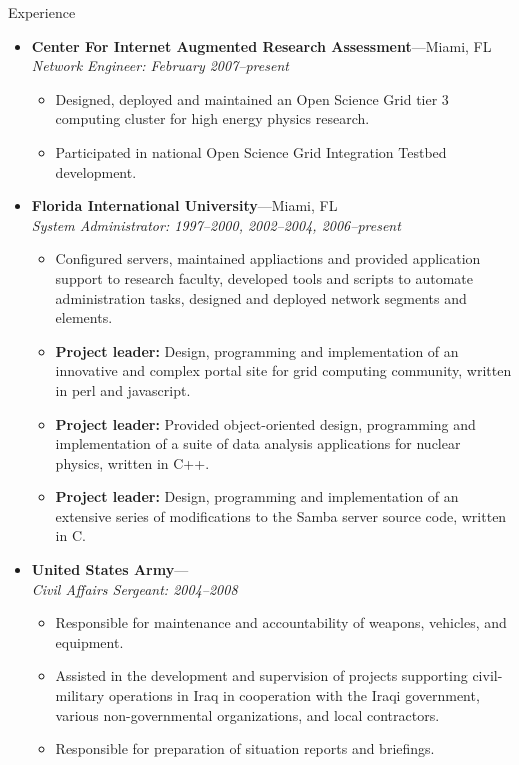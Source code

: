 \documentclass[9pt,oneside]{article}
\newenvironment{ressection}[1]{
	\vspace{4pt}
	{\fontfamily{phv}\selectfont\Large#1}
	\begin{itemize}
	\vspace{3pt}
}{
	\end{itemize}
}
\newcommand{\ressubitem}[1]{
	\vspace{-1pt}
	\item \begin{flushleft} #1 \end{flushleft}
}
\newcommand{\resbigitem}[3]{
	\vspace{-5pt}
	\item
	\textbf{#1}---#2 \\
	\textit{#3}
}
\newenvironment{ressubsec}[3]{
	\resbigitem{#1}{#2}{#3}
	\vspace{-2pt}
	\begin{itemize}
}{
	\end{itemize}
}
\begin{document}
\begin{ressection}{Experience}

	\begin{ressubsec}{Center For Internet Augmented Research Assessment}{Miami, FL}{Network Engineer: February 2007--present}
		\ressubitem{Designed, deployed and maintained an Open Science Grid tier 3 computing cluster for high energy physics research.}
		\ressubitem{Participated in national Open Science Grid Integration Testbed development.}
	\end{ressubsec}

	\begin{ressubsec}{Florida International University}{Miami, FL}{System Administrator: 1997--2000, 2002--2004, 2006--present}
		\ressubitem{Configured servers, maintained appliactions and provided application support to research faculty, developed tools and scripts to automate administration tasks, designed and deployed network segments and elements.}
		\ressubitem{\textbf{Project leader:} Design, programming and implementation of an innovative and complex portal site for grid computing community, written in perl and javascript.}
		\ressubitem{\textbf{Project leader:} Provided object-oriented design, programming and implementation of a suite of data analysis applications for nuclear physics, written in C++.}
		\ressubitem{\textbf{Project leader:} Design, programming and implementation of an extensive series of modifications to the Samba server source code, written in C.}
	\end{ressubsec}

	\begin{ressubsec}{United States Army}{}{Civil Affairs Sergeant: 2004--2008}
		\ressubitem{Responsible for maintenance and accountability of weapons, vehicles, and equipment.}
		\ressubitem{Assisted in the development and supervision of projects supporting civil-military operations in Iraq in cooperation with the Iraqi government, various non-governmental organizations, and local contractors.}
		\ressubitem{Responsible for preparation of situation reports and briefings.}
	\end{ressubsec}

\end{ressection}
\end{document}
